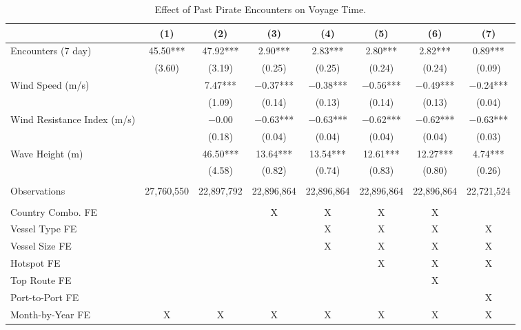 \begin{table}
\centering
\caption{Effect of Past Pirate Encounters on Voyage Time. \label{tab:spec-time-table-rev}}
\centering
\begin{adjustbox}{width = .9\textwidth}
\begin{threeparttable}
\begin{tabular}[t]{lccccccc}
\toprule
  & (1) & (2) & (3) & (4) & (5) & (6) & (7)\\
\midrule
Encounters (7 day) & \num{45.50}*** & \num{47.92}*** & \num{2.90}*** & \num{2.83}*** & \num{2.80}*** & \num{2.82}*** & \num{0.89}***\\
 & (\num{3.60}) & (\num{3.19}) & (\num{0.25}) & (\num{0.25}) & (\num{0.24}) & (\num{0.24}) & (\num{0.09})\\
Wind Speed (m/s) &  & \num{7.47}*** & \num{-0.37}*** & \num{-0.38}*** & \num{-0.56}*** & \num{-0.49}*** & \num{-0.24}***\\
 &  & (\num{1.09}) & (\num{0.14}) & (\num{0.13}) & (\num{0.14}) & (\num{0.13}) & (\num{0.04})\\
Wind Resistance Index (m/s) &  & \num{-0.00} & \num{-0.63}*** & \num{-0.63}*** & \num{-0.62}*** & \num{-0.62}*** & \num{-0.63}***\\
 &  & (\num{0.18}) & (\num{0.04}) & (\num{0.04}) & (\num{0.04}) & (\num{0.04}) & (\num{0.03})\\
Wave Height (m) &  & \num{46.50}*** & \num{13.64}*** & \num{13.54}*** & \num{12.61}*** & \num{12.27}*** & \num{4.74}***\\
 &  & (\num{4.58}) & (\num{0.82}) & (\num{0.74}) & (\num{0.83}) & (\num{0.80}) & (\num{0.26})\\
 &  &  &  &  &  &  & \\
Observations & 27,760,550 & 22,897,792 & 22,896,864 & 22,896,864 & 22,896,864 & 22,896,864 & 22,721,524\\
 &  &  &  &  &  &  & \\
Country Combo. FE &  &  & X & X & X & X & \\
Vessel Type FE &  &  &  & X & X & X & X\\
Vessel Size FE &  &  &  & X & X & X & X\\
Hotspot FE &  &  &  &  & X & X & X\\
Top Route FE &  &  &  &  &  & X & \\
Port-to-Port FE &  &  &  &  &  &  & X\\
Month-by-Year FE & X & X & X & X & X & X & X\\
\bottomrule
\end{tabular}

\end{threeparttable}
\end{adjustbox}
\end{table}
